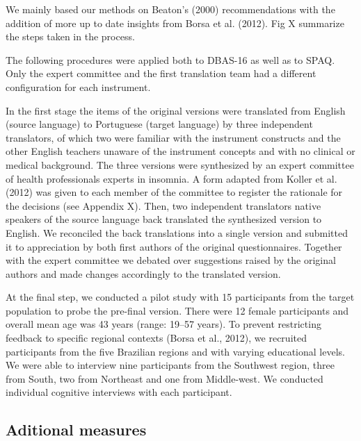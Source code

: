 \documentclass[
  ,doc,11pt, twoside,floatsintext]{apa6}
\begin{document}
We mainly based our methods on Beaton's (2000) recommendations with the addition of more up to date insights from Borsa et al. (2012). Fig X summarize the steps taken in the process.

The following procedures were applied both to DBAS-16 as well as to SPAQ. Only the expert committee and the first translation team had a different configuration for each instrument.

In the first stage the items of the original versions were translated from English (source language) to Portuguese (target language) by three independent translators, of which two were familiar with the instrument constructs and the other English teachers unaware of the instrument concepts and with no clinical or medical background. The three versions were synthesized by an expert committee of health professionals experts in insomnia. A form adapted from Koller et al. (2012) was given to each member of the committee to register the rationale for the decisions (see Appendix X). Then, two independent translators native speakers of the source language back translated the synthesized version to English. We reconciled the back translations into a single version and submitted it to appreciation by both first authors of the original questionnaires. Together with the expert committee we debated over suggestions raised by the original authors and made changes accordingly to the translated version.

At the final step, we conducted a pilot study with 15 participants from the target population to probe the pre-final version. There were 12 female participants and overall mean age was 43 years (range: 19--57 years). To prevent restricting feedback to specific regional contexts (Borsa et al., 2012), we recruited participants from the five Brazilian regions and with varying educational levels. We were able to interview nine participants from the Southwest region, three from South, two from Northeast and one from Middle-west. We conducted individual cognitive interviews with each participant.

\hypertarget{aditional-measures}{%
\subsection{Aditional measures}\label{aditional-measures}}
\end{document}
